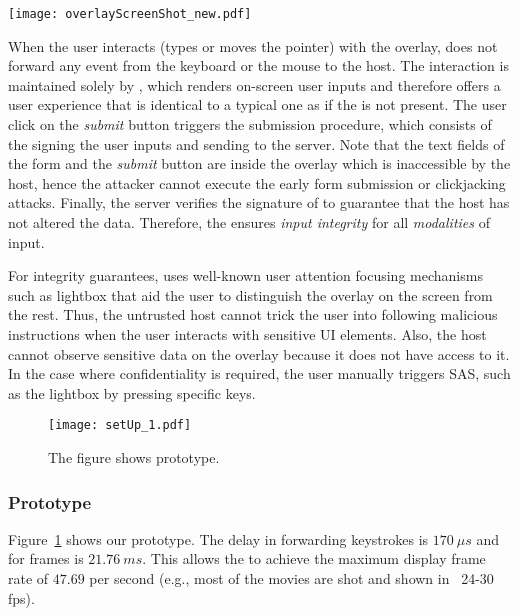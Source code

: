 \begin{figure*}[t]
	\centering
	\texttt{[image: overlayScreenShot\_new.pdf]}
	\caption{\name's high-level approach shows that the \device generates UI overlay to protect IO integrity and confidentiality.}
	\label{fig:screenshot_1}
\end{figure*}

When the user interacts (types or moves the pointer) with the overlay, \device does not forward any event from the keyboard or the mouse to the host. The interaction is maintained solely by \device, which renders on-screen user inputs and therefore offers a user experience that is identical to a typical one as if the \device is not present. The user click on the \emph{submit} button triggers the submission procedure, which consists of the \device signing the user inputs and sending to the server. Note that the text fields of the form and the \emph{submit} button are inside the overlay which is inaccessible by the host, hence the attacker cannot execute the early form submission or clickjacking attacks. Finally, the server verifies the signature of \device to guarantee that the host has not altered the data. Therefore, the \device ensures \emph{input integrity} for all \emph{modalities} of input.

For integrity guarantees, \name uses well-known user attention focusing mechanisms such as lightbox that aid the user to distinguish the \device overlay on the screen from the rest. Thus, the untrusted host cannot trick the user into following malicious instructions when the user interacts with sensitive UI elements. Also, the host cannot observe sensitive data on the overlay because it does not have access to it. In the case where confidentiality is required, the user manually triggers SAS, such as the lightbox by pressing specific keys.


\begin{figure}[t]
	\centering
	\texttt{[image: setUp\_1.pdf]}
	\caption{The figure shows \name prototype.}
\label{fig:prototypeArch}   
\end{figure}

\subsubsection*{Prototype}

Figure~\ref{fig:prototypeArch} shows our \device prototype.
The delay in forwarding keystrokes is $170\ \mu s$ and for frames is $21.76\ ms$. This allows the \device to achieve the maximum display frame rate of $47.69$ per second (e.g., most of the movies are shot and shown in  ~24-30 fps).






